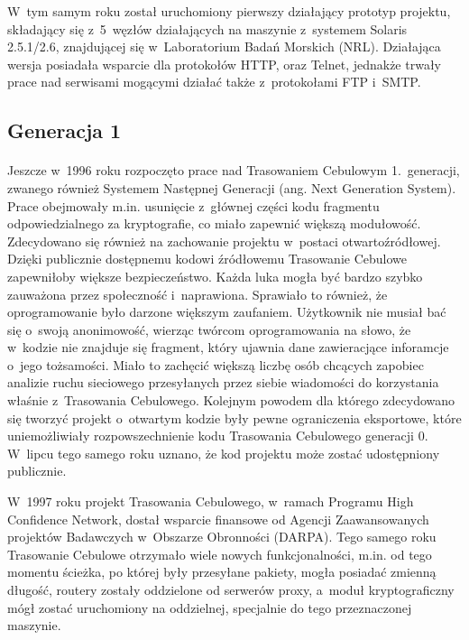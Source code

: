 W~tym samym roku został uruchomiony pierwszy działający prototyp projektu, składający się z~5~węzłów działających na maszynie z~systemem Solaris 2.5.1/2.6, znajdującej się w~Laboratorium Badań Morskich (NRL)\cite{onion_router_history}. Działająca wersja posiadała wsparcie dla protokołów HTTP, oraz Telnet, jednakże trwały prace nad serwisami mogącymi działać także z~protokołami FTP i~SMTP\cite{hiding_routing_information}.

\subsection{Generacja 1}\paragraph{}
Jeszcze w~1996 roku rozpoczęto prace nad Trasowaniem Cebulowym 1.~generacji, zwanego również Systemem Następnej Generacji (ang. Next Generation System)\cite{onion_router}. Prace obejmowały m.in. usunięcie z~głównej części kodu fragmentu odpowiedzialnego za kryptografie, co miało zapewnić większą modułowość. Zdecydowano się również na zachowanie projektu w~postaci otwartoźródłowej. Dzięki publicznie dostępnemu kodowi źródłowemu Trasowanie Cebulowe zapewniłoby większe bezpieczeństwo. Każda luka mogła być bardzo szybko zauważona przez społeczność i~naprawiona. Sprawiało to również, że oprogramowanie było darzone większym zaufaniem. Użytkownik nie musiał bać się o~swoją anonimowość, wierząc twórcom oprogramowania na słowo, że w~kodzie nie znajduje się fragment, który ujawnia dane zawieracjące inforamcje o~jego tożsamości. Miało to zachęcić większą liczbę osób chcących zapobiec analizie ruchu sieciowego przesyłanych przez siebie wiadomości do korzystania właśnie z~Trasowania Cebulowego. Kolejnym powodem dla którego zdecydowano się tworzyć projekt o~otwartym kodzie były pewne ograniczenia eksportowe, które uniemożliwiały rozpowszechnienie kodu Trasowania Cebulowego generacji 0. W~lipcu tego samego roku uznano, że kod projektu może zostać udostępniony publicznie.

W~1997 roku projekt Trasowania Cebulowego,  w~ramach Programu High Confidence Network, dostał wsparcie finansowe od Agencji Zaawansowanych projektów Badawczych w~Obszarze Obronności (DARPA). Tego samego roku Trasowanie Cebulowe otrzymało wiele nowych funkcjonalności, m.in. od tego momentu ścieżka, po której były przesyłane pakiety, mogła posiadać zmienną długość, routery zostały oddzielone od serwerów proxy, a~moduł kryptograficzny mógł zostać uruchomiony na oddzielnej, specjalnie do tego przeznaczonej maszynie. 

